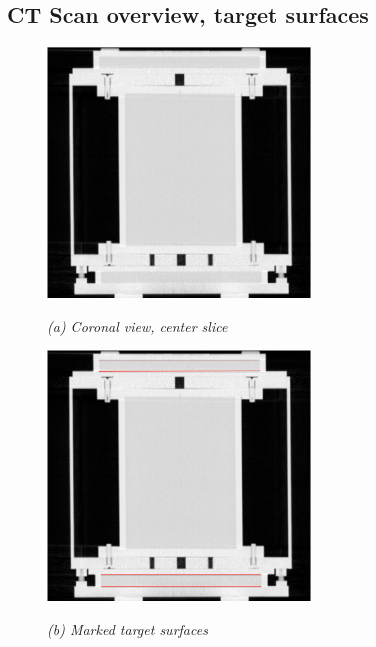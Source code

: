 
\subsection{CT Scan overview, target surfaces}
\begin{figure}[htb]
  \begin{minipage}[t]{2.75in}
    \centering
    \centerline{\mbox{\includegraphics[width=2.75in]{data_extraction/images/targets/ct_coronal_mid_slice.eps}}}
    \centerline{\emph{(a) Coronal view, center slice}}
  \end{minipage}\medskip
  \begin{minipage}[t]{2.75in}
    \centering
    \centerline{\mbox{\includegraphics[width=2.75in]{data_extraction/images/targets/ct_coronal_mid_slice_marked_surface.eps}}}
    \centerline{\emph{(b) Marked target surfaces}}
  \end{minipage}
\end{figure}

